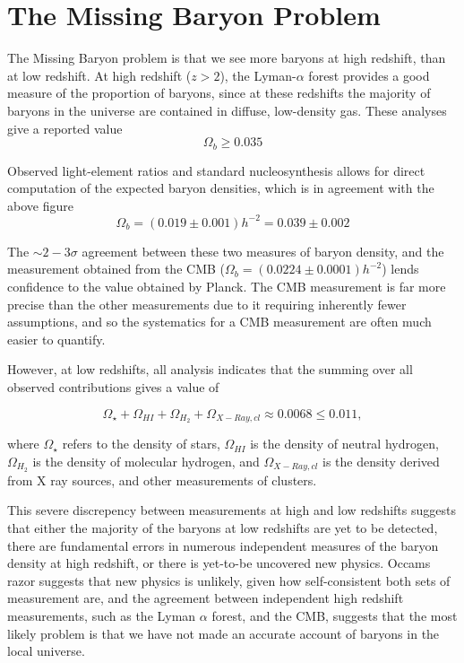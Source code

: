 \chapter{The Missing Baryon Problem}

The Missing Baryon problem is that we see more baryons at high redshift, than at low redshift. At high redshift ($z>2$), the Lyman-$\alpha$ forest provides a good measure of the proportion of baryons, since at these redshifts the majority of baryons in the universe are contained in diffuse, low-density gas. These analyses give a reported value 
$$\Omega_{b} \geq 0.035 $$ 

Observed light-element ratios and standard nucleosynthesis allows for direct computation of the expected baryon densities, which is in agreement with the above figure \citep{1998sese.conf..113B}
$$\Omega_{b} = (0.019\pm 0.001)h^{-2} = 0.039 \pm 0.002 $$

The $\sim 2-3 \sigma$ agreement between these two measures of baryon density, and the measurement obtained from the CMB ($\Omega_{b} = (0.0224 \pm 0.0001) h^{-2}$) lends confidence to the value obtained by Planck. The CMB measurement is far more precise than the other measurements due to it requiring inherently fewer assumptions, and so the systematics for a CMB measurement are often much easier to quantify. 

\par However, at low redshifts, all analysis indicates that the summing over all observed contributions gives a value of 

$$\Omega_\star + \Omega_{HI} + \Omega_{H_2} + \Omega_{X-Ray,cl} \approx 0.0068 \leq 0.011, $$

where $\Omega_\star$ refers to the density of stars, $\Omega_{HI}$ is the density of neutral hydrogen, $\Omega_{H_2}$ is the density of molecular hydrogen, and $\Omega_{X-Ray,cl} $ is the density derived from X ray sources, and other measurements of clusters.
\par This severe discrepency between measurements at high and low redshifts suggests that either the majority of the baryons at low redshifts are yet to be detected, there are fundamental errors in numerous independent measures of the baryon density at high redshift, or there is yet-to-be uncovered new physics. Occams razor suggests that new physics is unlikely, given how self-consistent both sets of measurement are, and the agreement between independent high redshift measurements, such as the Lyman $\alpha$ forest, and the CMB, suggests that the most likely problem is that we have not made an accurate account of baryons in the local universe.

